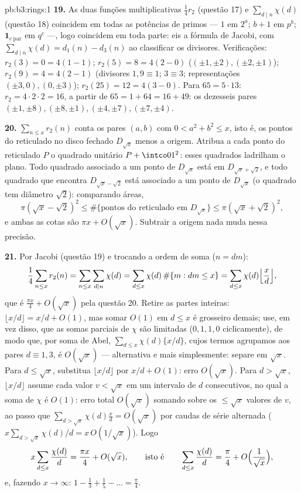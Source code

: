 \begin{solution}{pb:b3:rings:1}
\textbf{19.} As duas funções multiplicativas $\frac14r_2$ (questão 17) e $\sum_{d\mid n}\chi(d)$
(questão 18) coincidem em todas as potências de primos --- $1$ em
$2^a$; $b + 1$ em $p^b$; $\mathbf 1_{c\ \mathrm{par}}$ em $q^c$ ---, logo
coincidem em toda parte: eis a fórmula de Jacobi, com $\sum_{d\mid
n}\chi(d) = d_1(n) - d_3(n)$ ao classificar
os divisores. Verificações: $r_2(3) = 0 = 4(1 - 1)$; $r_2(5) = 8 = 4(2 - 0)$ ($(\pm1,\pm2), (\pm2,\pm1)$); $r_2(9) = 4 = 4(2 - 1)$ (divisores $1, 9 \equiv 1$;
$3 \equiv 3$; representações $(\pm3, 0), (0, \pm3)$); $r_2(25) = 12 = 4(3 - 0)$. Para $65 =
5\cdot13$: $r_2 = 4\cdot2\cdot2 = 16$, a partir de $65 = 1 + 64 = 16
+ 49$:
os dezesseis pares $(\pm1, \pm8), (\pm8, \pm1), (\pm4,
\pm7), (\pm7, \pm4)$.

\textbf{20.} $\sum_{n \leq x}r_2(n)$ conta os pares $(a, b)$ com $0 < a^2 + b^2 \leq x$, isto é, os
pontos do reticulado no disco fechado $D_{\sqrt x}$ menos a origem. Atribua a
cada ponto do reticulado $P$ o quadrado unitário $P + \intco01^2$: esses
quadrados ladrilham o plano. Todo quadrado associado a um ponto de $D_{\sqrt x}$
está em $D_{\sqrt x + \sqrt2}$, e todo quadrado que encontra $D_{\sqrt x - \sqrt 2}$ está associado a um
ponto de $D_{\sqrt x}$ (o quadrado tem diâmetro $\sqrt 2$): comparando áreas,
\[
\pi(\sqrt x - \sqrt2)^2 \leq \#\{\text{pontos do reticulado em }
D_{\sqrt x}\} \leq \pi(\sqrt x + \sqrt 2)^2,
\]
e ambas as cotas são $\pi x + O(\sqrt x)$. Subtrair a origem nada muda nessa precisão.

\textbf{21.} Por Jacobi (questão 19) e trocando a ordem de soma
($n = dm$):
\[
\frac14\sum_{n\leq x}r_2(n) = \sum_{n \leq x}\sum_{d \mid
n}\chi(d) = \sum_{d \leq x}\chi(d)\,\#\{m : dm \leq x\}
= \sum_{d\leq x}\chi(d)\Bigl\lfloor\frac xd\Bigr\rfloor,
\]
que é $\frac{\pi x}4 + O(\sqrt x)$ pela questão 20. Retire as partes inteiras: $\lfloor x/d\rfloor = x/d + O(1)$, mas somar
$O(1)$ em $d \leq x$ é grosseiro demais; use, em vez disso, que as somas
parciais de $\chi$ são limitadas ($0, 1, 1, 0$ ciclicamente), de modo que,
por soma de Abel, $\sum_{d\leq x}\chi(d)\{x/d\}$, cujos termos agrupamos aos pares $d \equiv 1, 3$, é $O(\sqrt x)$
--- alternativa e mais simplesmente: separe em $\sqrt x$. Para $d \leq
\sqrt x$,
substitua $\lfloor x/d\rfloor$ por $x/d + O(1)$: erro $O(\sqrt x)$. Para $d > \sqrt x$, $\lfloor x/d\rfloor$ assume cada valor
$v < \sqrt x$ em um intervalo de $d$ consecutivos, no qual a soma de
$\chi$ é $O(1)$: erro total $O(\sqrt x)$ somando sobre os $\leq \sqrt x$ valores
de $v$, ao passo que $\sum_{d > \sqrt x}\chi(d)\frac xd = O(\sqrt x)$ por caudas de série alternada ($x\sum_{d>\sqrt x}\chi(d)/d =
x\,O(1/\sqrt x)$). Logo
\[
x\sum_{d \leq x}\frac{\chi(d)}d = \frac{\pi x}4 + O(\sqrt x),
\qquad\text{isto é}\qquad
\sum_{d\leq x}\frac{\chi(d)}d = \frac\pi4 +
O\Bigl(\frac1{\sqrt x}\Bigr),
\]
e, fazendo $x \to \infty$: $1 - \frac13 + \frac15 - \dots =
\frac\pi4$.


\end{solution}
